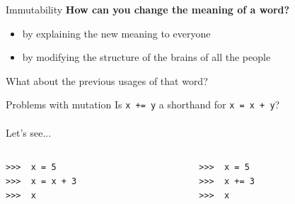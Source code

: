 \documentclass{beamer}
\newcommand{\prompt}{\phantom{}>\phantom{}>\phantom{}>\ }
\begin{document}
\begin{frame}{Immutability} \pause
  {\large \textbf{How can you change the meaning of a word?}} \pause
  \ \\
  \begin{itemize}
  \item by explaining the new meaning to everyone \pause
  \item by modifying the structure of the brains of all the people \pause
  \end{itemize}
  {\footnotesize What about the previous usages of that word?}
\end{frame}

\begin{frame}{Problems with mutation} 
  Is \texttt{x += y} a shorthand for \texttt{x = x + y}? \\ \pause
  \ \\
  Let's see... \\ \pause
  \begin{columns}[T] %
    \begin{column}{.48\textwidth}
      \begin{small}
        \texttt{\prompt{} x = 5\\ \pause
          \prompt{} x = x + 3 \\ \pause
          \prompt{} x \\  \\ \pause
          \ \\ \ \\ \ \\ \ \\ \ \\ \ \\ \ \\ \ \\
        }
      \end{small}
    \end{column}%
    \hfill%
    \begin{column}{.48\textwidth}
      \begin{small}
        \texttt{\prompt{} x = 5\\ \pause
          \prompt{} x += 3 \\ \pause
          \prompt{} x \\  \\
          \ \\ \ \\ \ \\ \ \\ \ \\ \ \\ \ \\ \ \\
        }
      \end{small}
    \end{column}
  \end{columns} 
\end{frame}
\end{document}
